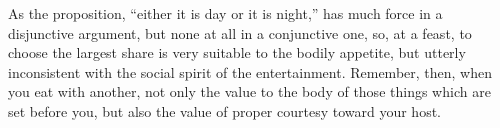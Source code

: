 As the proposition,  ``either it is day or  it is night,'' has much  force in a
disjunctive argument, but none at all in  a conjunctive one, so, at a feast, to
choose the largest  share is very suitable to the  bodily appetite, but utterly
inconsistent with the social spirit  of the entertainment. Remember, then, when
you eat with another, not only the value  to the body of those things which are
set before you, but also the value of proper courtesy toward your host.

